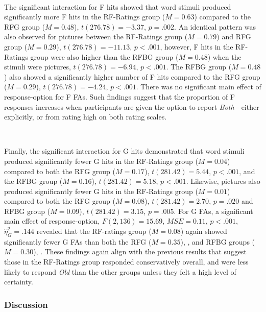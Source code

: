 \documentclass[
  11pt,
]{article}
\begin{document}
~

The significant interaction for F hits showed that word stimuli produced
significantly more F hits in the RF-Ratings group (\(M = 0.63\))
compared to the RFG group (\(M = 0.48\)), \(t(276.78) = -3.37\),
\(p = .002\). An identical pattern was also observed for pictures
between the RF-Ratings group (\(M = 0.79\)) and RFG group
(\(M = 0.29\)), \(t(276.78) = -11.13\), \(p < .001\), however, F hits in
the RF-Ratings group were also higher than the RFBG group (\(M = 0.48\))
when the stimuli were pictures, \(t(276.78) = -6.94\), \(p < .001\). The
RFBG group (\(M = 0.48\)) also showed a significantly higher number of F
hits compared to the RFG group (\(M = 0.29\)), \(t(276.78) = -4.24\),
\(p < .001\). There was no significant main effect of response-option
for F FAs. Such findings suggest that the proportion of F responses
increases when participants are given the option to report \emph{Both} -
either explicitly, or from rating high on both rating scales.

~

Finally, the significant interaction for G hits demonstrated that word
stimuli produced significantly fewer G hits in the RF-Ratings group
(\(M = 0.04\)) compared to both the RFG group (\(M = 0.17\)),
\(t(281.42) = 5.44\), \(p < .001\), and the RFBG group (\(M = 0.16\)),
\(t(281.42) = 5.18\), \(p < .001\). Likewise, pictures also produced
significantly fewer G hits in the RF-Ratings group (\(M = 0.01\))
compared to both the RFG group (\(M = 0.08\)), \(t(281.42) = 2.70\),
\(p = .020\) and RFBG group (\(M = 0.09\)), \(t(281.42) = 3.15\),
\(p = .005\). For G FAs, a significant main effect of response-option,
\(F(2, 136) = 15.69\), \(\mathit{MSE} = 0.11\), \(p < .001\),
\(\hat{\eta}^2_G = .144\) revealed that the RF-ratings group
(\(M = 0.08\)) again showed significantly fewer G FAs than both the RFG
(\(M = 0.35\)), , and RFBG groups (\(M = 0.30\)), . These findings again
align with the previous results that suggest those in the RF-Ratings
group responded conservatively overall, and were less likely to respond
\emph{Old} than the other groups unless they felt a high level of
certainty.

\hypertarget{discussion}{%
\subsubsection{Discussion}\label{discussion}}
\end{document}
